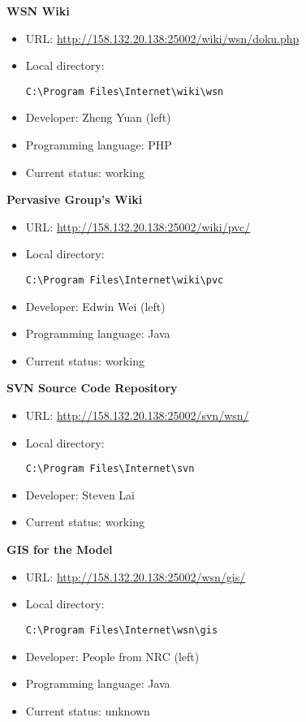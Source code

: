 \textbf{WSN Wiki}
\begin{itemize}
\item URL: \url{http://158.132.20.138:25002/wiki/wsn/doku.php}
\item Local directory: \begin{verbatim}C:\Program Files\Internet\wiki\wsn\end{verbatim}
\item Developer: Zheng Yuan (left)
\item Programming language: PHP
\item Current status: working
\end{itemize}
\textbf{Pervasive Group's Wiki}
\begin{itemize}
\item URL: \url{http://158.132.20.138:25002/wiki/pvc/}
\item Local directory: \begin{verbatim}C:\Program Files\Internet\wiki\pvc\end{verbatim}
\item Developer: Edwin Wei (left)
\item Programming language: Java
\item Current status: working
\end{itemize}
\textbf{SVN Source Code Repository}
\begin{itemize}
\item URL: \url{http://158.132.20.138:25002/svn/wsn/}
\item Local directory: \begin{verbatim}C:\Program Files\Internet\svn\end{verbatim}
\item Developer: Steven Lai
\item Current status: working
\end{itemize}
\textbf{GIS for the Model}
\begin{itemize}
\item URL: \url{http://158.132.20.138:25002/wsn/gis/}
\item Local directory: \begin{verbatim}C:\Program Files\Internet\wsn\gis\end{verbatim}
\item Developer: People from NRC (left)
\item Programming language: Java
\item Current status: unknown
\end{itemize}

